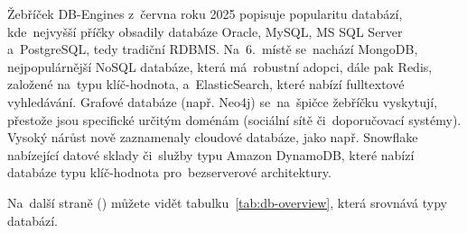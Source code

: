 Žebříček DB-Engines z~června roku 2025 popisuje popularitu databází,
kde~nejvyšší příčky obsadily databáze Oracle, MySQL, MS SQL Server
a~PostgreSQL, tedy tradiční RDBMS. Na~6.~místě se~nachází MongoDB,
nejpopulárnější NoSQL databáze, která má~robustní adopci, dále pak
Redis, založené na~typu klíč-hodnota, a~ElasticSearch, které nabízí
fulltextové vyhledávání. Grafové databáze (např. Neo4j) se~na~špičce
žebříčku vyskytují, přestože jsou specifické určitým doménám
(sociální sítě či~doporučovací systémy). Vysoký nárůst nově zaznamenaly
cloudové databáze, jako např. Snowflake nabízející datové sklady či~služby
typu Amazon DynamoDB, které nabízí databáze typu klíč-hodnota
pro~bezserverové architektury. \cite{YHVfLHsNlUItkF6G,gT0jW3Rz4pdfcjnO}

Na~další straně (\pageref{tab:db-overview}) můžete vidět
tabulku~\ref{tab:db-overview}, která srovnává typy databází.

\clearpage

